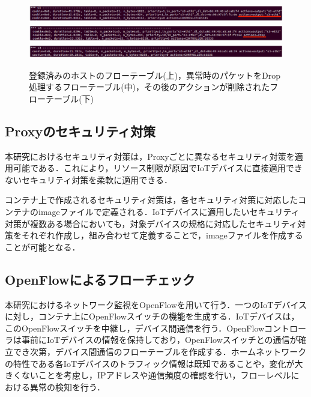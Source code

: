 \documentclass[a4paper,10pt,twocolumn,uplatex]{jsarticle}
\begin{document}
\begin{figure}[!tb]
  \centering
  \includegraphics[width=\linewidth]{img/result_flow4v3.eps}
  \includegraphics[width=\linewidth]{img/result_flow2v3.eps}
  \includegraphics[width=\linewidth]{img/result_flow3v2.eps}
  \caption{登録済みのホストのフローテーブル(上)，異常時のパケットをDrop処理するフローテーブル(中)，その後のアクションが削除されたフローテーブル(下)}
  \label{fig:result1}
\end{figure}

\subsection{Proxyのセキュリティ対策}
本研究におけるセキュリティ対策は，Proxyごとに異なるセキュリティ対策を適用可能である．これにより，リソース制限が原因でIoTデバイスに直接適用できないセキュリティ対策を柔軟に適用できる．\par
コンテナ上で作成されるセキュリティ対策は，各セキュリティ対策に対応したコンテナのimageファイルで定義される．IoTデバイスに適用したいセキュリティ対策が複数ある場合においても，対象デバイスの規格に対応したセキュリティ対策をそれぞれ作成し，組み合わせて定義することで，imageファイルを作成することが可能となる．

\subsection{OpenFlowによるフローチェック}
本研究におけるネットワーク監視をOpenFlowを用いて行う．一つのIoTデバイスに対し，コンテナ上にOpenFlowスイッチの機能を生成する．IoTデバイスは，このOpenFlowスイッチを中継し，デバイス間通信を行う．OpenFlowコントローラは事前にIoTデバイスの情報を保持しており，OpenFlowスイッチとの通信が確立でき次第，デバイス間通信のフローテーブルを作成する．ホームネットワークの特性である各IoTデバイスのトラフィック情報は既知であることや，変化が大きくないことを考慮し，IPアドレスや通信頻度の確認を行い，フローレベルにおける異常の検知を行う．
\end{document}

